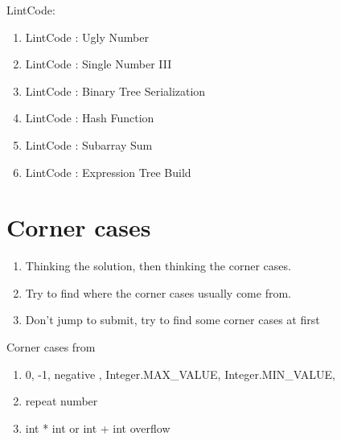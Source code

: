 LintCode:
\begin{enumerate}
    \item LintCode : Ugly Number
    \item LintCode : Single Number III
    \item LintCode : Binary Tree Serialization
    \item LintCode : Hash Function
    \item LintCode : Subarray Sum
    \item LintCode : Expression Tree Build
\end{enumerate}

\section{Corner cases}

\begin{enumerate}
    \item Thinking the solution, then thinking the corner cases.
    \item Try to find where the corner cases usually come from.
    \item Don't jump to submit, try to find some corner cases at first
\end{enumerate}

Corner cases from

\begin{enumerate}
    \item  0, -1, negative , Integer.MAX\_VALUE, Integer.MIN\_VALUE,
    \item  repeat number
    \item  int * int or int + int overflow
\end{enumerate}



